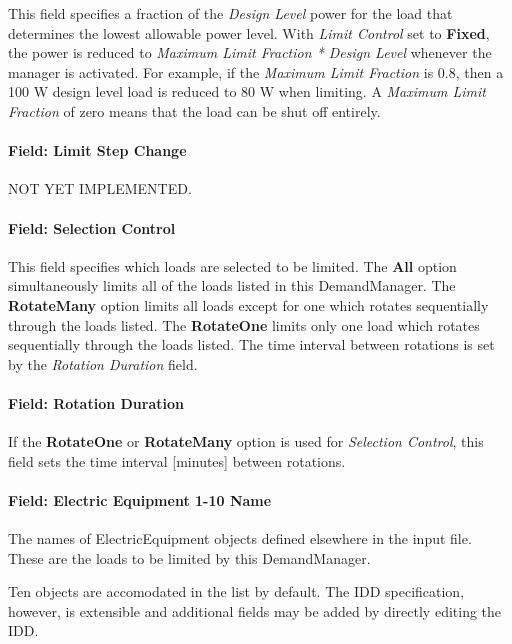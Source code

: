 This field specifies a fraction of the \emph{Design Level} power for the load that determines the lowest allowable power level. With \emph{Limit Control} set to \textbf{Fixed}, the power is reduced to \emph{Maximum Limit Fraction * Design Level} whenever the manager is activated. For example, if the \emph{Maximum Limit Fraction} is 0.8, then a 100 W design level load is reduced to 80 W when limiting. A \emph{Maximum Limit Fraction} of zero means that the load can be shut off entirely.

\paragraph{Field: Limit Step Change}\label{field-limit-step-change-2}

NOT YET IMPLEMENTED.

\paragraph{Field: Selection Control}\label{field-selection-control-2}

This field specifies which loads are selected to be limited. The \textbf{All} option simultaneously limits all of the loads listed in this DemandManager. The \textbf{RotateMany} option limits all loads except for one which rotates sequentially through the loads listed. The \textbf{RotateOne} limits only one load which rotates sequentially through the loads listed. The time interval between rotations is set by the \emph{Rotation Duration} field.

\paragraph{Field: Rotation Duration}\label{field-rotation-duration-2}

If the \textbf{RotateOne} or \textbf{RotateMany} option is used for \emph{Selection Control}, this field sets the time interval {[}minutes{]} between rotations.

\paragraph{Field: Electric Equipment 1-10 Name}\label{field-electric-equipment-1-10-name}

The names of ElectricEquipment objects defined elsewhere in the input file. These are the loads to be limited by this DemandManager.

Ten objects are accomodated in the list by default. The IDD specification, however, is extensible and additional fields may be added by directly editing the IDD.

